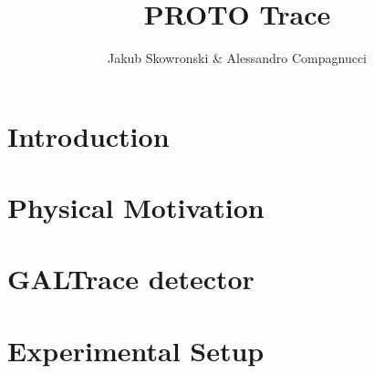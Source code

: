 \documentclass[a4paper, 11pt]{article}
\author{Jakub Skowronski \& Alessandro Compagnucci}
\title{PROTO Trace}
\begin{document}
\maketitle

\section{Introduction}



\section{Physical Motivation}



\section{GALTrace detector}



\section{Experimental Setup}


         
\end{document}
